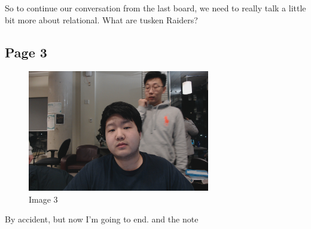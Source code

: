\documentclass{article}%
\begin{document}
%
So to continue our conversation from the last board, we need to really talk a little bit more about relational. What are tusken Raiders? \newline%

%
\subsection{Page 3}%
\label{subsec:Page 3}%


\begin{figure}[h!]%
\centering%
\includegraphics[width=300px]{../Notes/IntroductiontoDatabases/Note1/image3.jpg}%
\caption{Image 3}%
\end{figure}

%
By accident, but now I'm going to end. \newline%
 and the note \newline%

%
\end{document}
